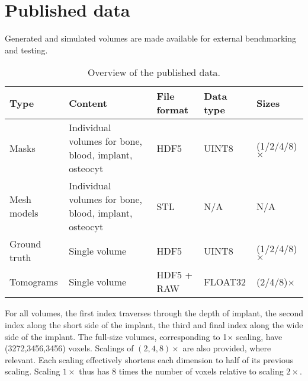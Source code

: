 \section{Published data}
\label{sec:pubdata}

Generated and simulated volumes are made available for external benchmarking and testing.

\begin{table*}
    \caption{Overview of the published data.}
    \label{tab:pubdata}
    \centering
    \begin{tabular}{@{}p{2cm}p{5cm}p{2.5cm}p{2.5cm}p{2.5cm}@{}}
    \toprule
	    \textbf{Type} & \textbf{Content} & \textbf{File format} & \textbf{Data type} & \textbf{Sizes} \\
    \midrule
	    Masks & Individual volumes for bone, blood, implant, osteocyt & HDF5 & UINT8 & (1/2/4/8)$\times$ \\
	    Mesh models & Individual volumes for bone, blood, implant, osteocyt & STL & N/A & N/A \\
	    Ground truth & Single volume & HDF5 & UINT8 & (1/2/4/8)$\times$ \\
	    Tomograms & Single volume & HDF5 + RAW & FLOAT32 & (2/4/8)$\times$ \\
    \bottomrule
    \end{tabular}
\end{table*}

For all volumes, the first index traverses through the depth of implant, the second index along the short side of the implant, the third and final index along the wide side of the implant. The full-size volumes, corresponding to 1$\times$ scaling, have (3272,3456,3456) voxels. Scalings of $(2,4,8)\times$ are also provided, where relevant. Each scaling effectively shortens each dimension to half of its previous scaling. Scaling $1\times$ thus has 8 times the number of voxels relative to scaling $2\times$.



